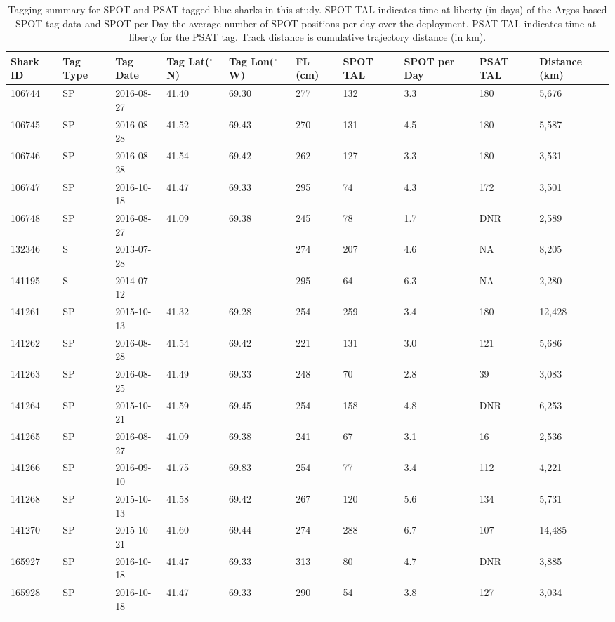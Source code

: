 \clearpage



\begin{landscape}
\begin{table}
\caption[Tagging summary for SPOT and PSAT-tagged blue sharks in this study]{Tagging summary for SPOT and PSAT-tagged blue sharks in this study. SPOT TAL indicates time-at-liberty (in days) of the Argos-based SPOT tag data and SPOT per Day the average number of SPOT positions per day over the deployment. PSAT TAL indicates time-at-liberty for the PSAT tag. Track distance is cumulative trajectory distance (in km).}
\label{tab:c5t1}
\centering
\begin{tabular}{p{1.5cm} p{.8cm} p{2cm} p{1.5cm} p{1.5cm} p{1cm} p{1cm} p{1cm} p{1cm} p{2cm}}
\toprule
Shark ID & Tag Type & Tag Date & Tag Lat($^\circ$N) & Tag Lon($^\circ$W) & FL (cm) & SPOT TAL & SPOT per Day & PSAT TAL & Distance (km)\\
\midrule
106744 & SP & 2016-08-27 & 41.40 & 69.30 & 277 & 132 & 3.3 & 180 & 5,676\\
106745 & SP & 2016-08-28 & 41.52 & 69.43 & 270 & 131 & 4.5 & 180 & 5,587\\
106746 & SP & 2016-08-28 & 41.54 & 69.42 & 262 & 127 & 3.3 & 180 & 3,531\\
106747 & SP & 2016-10-18 & 41.47 & 69.33 & 295 & 74 & 4.3 & 172 & 3,501\\
106748 & SP & 2016-08-27 & 41.09 & 69.38 & 245 & 78 & 1.7 & DNR & 2,589\\
132346 & S & 2013-07-28 &  &  & 274 & 207 & 4.6 & NA  & 8,205\\
141195 & S & 2014-07-12 &  &  & 295 & 64 & 6.3 & NA & 2,280\\
141261 & SP & 2015-10-13 & 41.32 & 69.28 & 254 & 259 & 3.4 & 180 & 12,428\\
141262 & SP & 2016-08-28 & 41.54 & 69.42 & 221 & 131 & 3.0 & 121 & 5,686\\
141263 & SP & 2016-08-25 & 41.49 & 69.33 & 248 & 70 & 2.8 & 39 & 3,083\\
141264 & SP & 2015-10-21 & 41.59 & 69.45 & 254 & 158 & 4.8 & DNR & 6,253\\
141265 & SP & 2016-08-27 & 41.09 & 69.38 & 241 & 67 & 3.1 & 16 & 2,536\\
141266 & SP & 2016-09-10 & 41.75 & 69.83 & 254 & 77 & 3.4 & 112 & 4,221\\
141268 & SP & 2015-10-13 & 41.58 & 69.42 & 267 & 120 & 5.6 & 134 & 5,731\\
141270 & SP & 2015-10-21 & 41.60 & 69.44 & 274 & 288 & 6.7 & 107 & 14,485\\
165927 & SP & 2016-10-18 & 41.47 & 69.33 & 313 & 80 & 4.7 & DNR & 3,885\\
165928 & SP & 2016-10-18 & 41.47 & 69.33 & 290 & 54 & 3.8 & 127 & 3,034\\
\bottomrule
\end{tabular}
\end{table}
\end{landscape}

